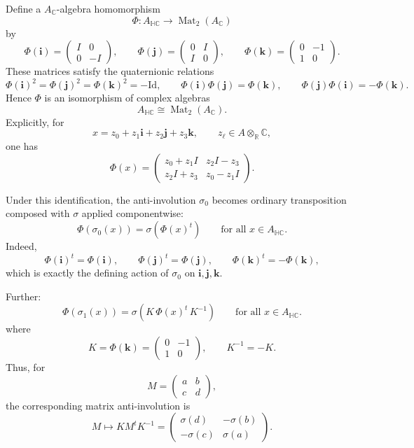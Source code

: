 \documentclass[oneside,11pt]{amsart}
\theoremstyle{definition}
\theoremstyle{remark}
\numberwithin{thm}{section}
\numberwithin{equation}{section}
\begin{document}
Define a \(A_\mathbb C\)-algebra homomorphism
\[
\Phi:A_{\mathbb{HC}}\longrightarrow \operatorname{Mat}_2(A_\mathbb C)
\]
by
\[
\Phi(\mathbf i)=
\begin{pmatrix}
I&0\\
0&-I
\end{pmatrix},
\qquad
\Phi(\mathbf j)=
\begin{pmatrix}
0&I\\
I&0
\end{pmatrix},
\qquad
\Phi(\mathbf k)=
\begin{pmatrix}
0&-1\\
1&0
\end{pmatrix}.
\]
These matrices satisfy the quaternionic relations
\[
\Phi(\mathbf i)^2=\Phi(\mathbf j)^2=\Phi(\mathbf k)^2=-\mathrm{Id},
\qquad
\Phi(\mathbf i)\Phi(\mathbf j)=\Phi(\mathbf k),
\qquad
\Phi(\mathbf j)\Phi(\mathbf i)=-\Phi(\mathbf k).
\]
Hence \(\Phi\) is an isomorphism of complex algebras
\[
A_{\mathbb{HC}}\cong \operatorname{Mat}_2(A_\mathbb C).
\]
Explicitly, for
\[
x=z_0+z_1\mathbf i+z_2\mathbf j+z_3\mathbf k,
\qquad z_\ell\in A\otimes_\mathbb R\mathbb C,
\]
one has
\[
\Phi(x)=
\begin{pmatrix}
z_0+ z_1I &  z_2I-z_3\\
 z_2I+z_3 & z_0- z_1I
\end{pmatrix}.
\]

Under this identification, the anti-involution \(\sigma_0\) becomes
ordinary transposition composed with $\sigma$ applied componentwise:
\[
\Phi(\sigma_0(x))=\sigma(\Phi(x)^t)
\qquad
\text{for all }x\in A_{\mathbb{HC}}.
\]
Indeed,
\[
\Phi(\mathbf i)^t=\Phi(\mathbf i),
\qquad
\Phi(\mathbf j)^t=\Phi(\mathbf j),
\qquad
\Phi(\mathbf k)^t=-\Phi(\mathbf k),
\]
which is exactly the defining action of \(\sigma_0\) on
\(\mathbf i,\mathbf j,\mathbf k\).

Further:
\[
\Phi(\sigma_1(x))
=
\sigma(K\,\Phi(x)^t\,K^{-1})
\qquad
\text{for all }x\in A_{\mathbb{HC}}.
\]
where
\[
K=\Phi(\mathbf k)=
\begin{pmatrix}
0&-1\\
1&0
\end{pmatrix},
\qquad
K^{-1}=-K.
\]
Thus, for
\[
M=
\begin{pmatrix}
a&b\\
c&d
\end{pmatrix},
\]
the corresponding matrix anti-involution is
\[
M\longmapsto K M^tK^{-1}
=
\begin{pmatrix}
\sigma(d)&-\sigma(b)\\
-\sigma(c)&\sigma(a)
\end{pmatrix}.
\]
\end{document}
